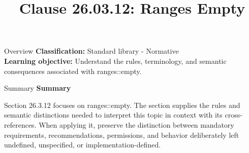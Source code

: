 \documentclass[10pt,letterpaper]{article}
\title{Clause 26.03.12: Ranges Empty}
\author{}
\date{}
\begin{document}
\maketitle
\begin{CornellOverviewBox}{Overview}
\textbf{Classification:} Standard library - Normative\\[2pt]
\textbf{Learning objective:} Understand the rules, terminology, and semantic consequences associated with ranges::empty.
\end{CornellOverviewBox}\begin{CornellSummaryBox}{Summary}
{\sffamily\bfseries\color{Accent} Summary}\par\vspace{3pt}Section 26.3.12 focuses on ranges::empty. The section supplies the rules and semantic distinctions needed to interpret this topic in context with its cross-references. When applying it, preserve the distinction between mandatory requirements, recommendations, permissions, and behavior deliberately left undefined, unspecified, or implementation-defined.
\end{CornellSummaryBox}
\end{document}
